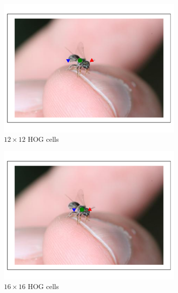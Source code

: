 \documentclass[11pt, oneside]{report}
\begin{document}
\begin{figure}[p]
\begin{subfigure}[b]{0.3\textwidth}
                \includegraphics[width=\textwidth]{hog12_2.pdf}
                \caption{$12\times12$ HOG cells}
            \end{subfigure}
            \begin{subfigure}[b]{0.3\textwidth}
                \centering
                \includegraphics[width=\textwidth]{hog16_2.pdf}
                \caption{$16\times16$ HOG cells}
            \end{subfigure}
            \begin{subfigure}[b]{0.3\textwidth}
                \centering

\end{subfigure}
\end{figure}
\end{document}
